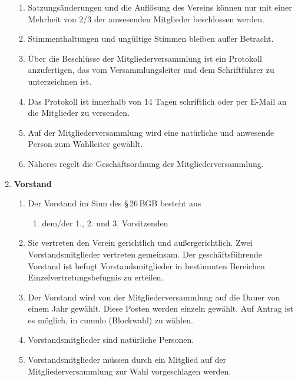 \documentclass[german]{article}
\newcommand{\paragr}[1]{\item \textsf{\textbf{#1}}}
\begin{document}
\begin{enumerate}
\begin{enumerate}
\item Satzungsänderungen und die Auflösung des Vereins können nur mit einer Mehrheit von 2/3 der anwesenden Mitglieder beschlossen werden.

\item Stimmenthaltungen und ungültige Stimmen bleiben außer Betracht.

\item Über die Beschlüsse der Mitgliederversammlung ist ein Protokoll anzufertigen, das vom Versammlungsleiter und dem Schriftführer zu unterzeichnen ist.

\item Das Protokoll ist innerhalb von 14 Tagen schriftlich oder per E-Mail an die Mitglieder zu versenden.

\item Auf der Mitgliederversammlung wird eine natürliche und anwesende Person zum Wahlleiter gewählt.

\item Näheres regelt die Geschäftsordnung der Mitgliederversammlung.

\end{enumerate}


\paragr{Vorstand}
\begin{enumerate}

\item Der Vorstand im Sinn des §\,26\,BGB besteht aus
\begin{enumerate}
\item dem/der 1., 2. und 3. Vorsitzenden
\end{enumerate}

\item Sie vertreten den Verein gerichtlich und außergerichtlich.
Zwei Vorstandsmitglieder vertreten gemeinsam. Der geschäftsführende Vorstand ist befugt Vorstandsmitglieder in bestimmten Bereichen Einzelvertretungsbefugnis zu erteilen.

\item Der Vorstand wird von der Mitgliederversammlung auf die Dauer von einem Jahr gewählt. 
Diese Posten werden einzeln gewählt. Auf Antrag ist es möglich, in cumulo (Blockwahl) zu wählen.

\item Vorstandsmitglieder sind natürliche Personen.

\item Vorstandsmitglieder müssen durch ein Mitglied auf der Mitgliederversammlung zur Wahl vorgeschlagen werden.


\end{enumerate}
\end{enumerate}
\end{document}

